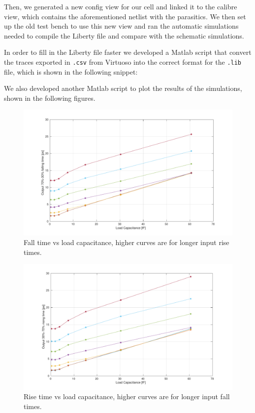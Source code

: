 \documentclass[a4paper]{article}
\begin{document}
Then, we generated a new config view for our cell and linked it to the calibre view, which contains the aforementioned netlist with the parasitics. We then set up the old test bench to use this new view and ran the automatic simulations needed to compile the Liberty file and compare with the schematic simulations.

In order to fill in the Liberty file faster we developed a Matlab script that convert the traces exported in \texttt{.csv} from Virtuoso into the correct format for the \texttt{.lib} file, which is shown in the following snippet:

We also developed another Matlab script to plot the results of the simulations, shown in the following figures.
\begin{figure}[H]
	\centering
	\includegraphics[width=\linewidth]{../INV_X4/simulations/t_F.pdf}
	\caption{Fall time vs load capacitance, higher curves are for longer input rise times.}
	\label{fig:inv_t_F}
\end{figure}
\begin{figure}[H]
	\centering
	\includegraphics[width=\linewidth]{../INV_X4/simulations/t_R.pdf}
	\caption{Rise time vs load capacitance, higher curves are for longer input fall times.}
	\label{fig:inv_t_R}
\end{figure}
\end{document}
